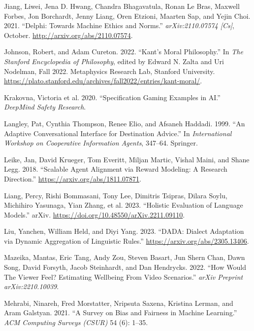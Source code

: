 \documentclass[
  letterpaper,
  DIV=11,
  numbers=noendperiod,
  oneside]{scrreprt}
\newlength{\cslhangindent}
\newenvironment{CSLReferences}[2] %
 {\begin{list}{}{%
  \setlength{\itemindent}{0pt}
  \setlength{\leftmargin}{0pt}
  \setlength{\parsep}{0pt}
  \ifodd #1
   \setlength{\leftmargin}{\cslhangindent}
   \setlength{\itemindent}{-1\cslhangindent}
  \fi
  \setlength{\itemsep}{#2\baselineskip}}}
 {\end{list}}
\theoremstyle{remark}
\begin{document}
\begin{CSLReferences}{1}{0}
Jiang, Liwei, Jena D. Hwang, Chandra Bhagavatula, Ronan Le Bras, Maxwell
Forbes, Jon Borchardt, Jenny Liang, Oren Etzioni, Maarten Sap, and Yejin
Choi. 2021. {``Delphi: {Towards} {Machine} {Ethics} and {Norms}.''}
\emph{arXiv:2110.07574 {[}Cs{]}}, October.
\url{http://arxiv.org/abs/2110.07574}.

Johnson, Robert, and Adam Cureton. 2022. {``Kant's {Moral}
{Philosophy}.''} In \emph{The {Stanford} {Encyclopedia} of
{Philosophy}}, edited by Edward N. Zalta and Uri Nodelman, Fall 2022.
Metaphysics Research Lab, Stanford University.
\url{https://plato.stanford.edu/archives/fall2022/entries/kant-moral/}.

Krakovna, Victoria et al. 2020. {``Specification Gaming Examples in
AI.''} \emph{DeepMind Safety Research}.

Langley, Pat, Cynthia Thompson, Renee Elio, and Afsaneh Haddadi. 1999.
{``An Adaptive Conversational Interface for Destination Advice.''} In
\emph{International Workshop on Cooperative Information Agents},
347--64. Springer.

Leike, Jan, David Krueger, Tom Everitt, Miljan Martic, Vishal Maini, and
Shane Legg. 2018. {``Scalable Agent Alignment via Reward Modeling: A
Research Direction.''} \url{https://arxiv.org/abs/1811.07871}.

Liang, Percy, Rishi Bommasani, Tony Lee, Dimitris Tsipras, Dilara Soylu,
Michihiro Yasunaga, Yian Zhang, et al. 2023. {``Holistic {Evaluation} of
{Language} {Models}.''} arXiv.
\url{https://doi.org/10.48550/arXiv.2211.09110}.

Liu, Yanchen, William Held, and Diyi Yang. 2023. {``DADA: Dialect
Adaptation via Dynamic Aggregation of Linguistic Rules.''}
\url{https://arxiv.org/abs/2305.13406}.

Mazeika, Mantas, Eric Tang, Andy Zou, Steven Basart, Jun Shern Chan,
Dawn Song, David Forsyth, Jacob Steinhardt, and Dan Hendrycks. 2022.
{``How {Would} {The} {Viewer} {Feel}? {Estimating} {Wellbeing} {From}
{Video} {Scenarios}.''} \emph{arXiv Preprint arXiv:2210.10039}.

Mehrabi, Ninareh, Fred Morstatter, Nripsuta Saxena, Kristina Lerman, and
Aram Galstyan. 2021. {``A Survey on Bias and Fairness in Machine
Learning.''} \emph{ACM Computing Surveys (CSUR)} 54 (6): 1--35.


\end{CSLReferences}
\end{document}
